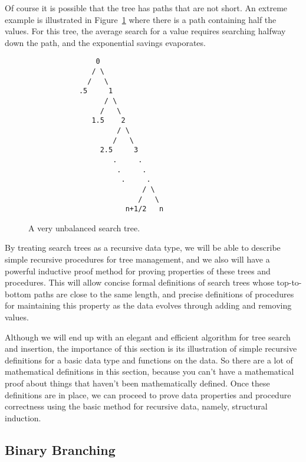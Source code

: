 \begin{definition}
Of course it is possible that the tree has paths that are not short.
An extreme example is illustrated in Figure~\ref{unbalanced} where
there is a path containing half the values.  For this tree, the
average search for a value requires searching halfway down the path,
and the exponential savings evaporates.

\begin{figure}

\begin{center}
\begin{verbatim}
                0
               / \
              /   \
            .5     1
                  / \
                 /   \
               1.5    2
                     / \
                    /   \
                 2.5     3  
                    .     .
                     .     .
                      .     .
                           / \
                          /   \
                       n+1/2   n  
\end{verbatim}   
\end{center}

\caption{A very unbalanced search tree.}

\label{unbalanced}

\end{figure}

By treating search trees as a recursive data type, we will be able to
describe simple recursive procedures for tree management, and we also
will have a powerful inductive proof method for proving properties of
these trees and procedures.  This will allow concise formal
definitions of search trees whose top-to-bottom paths are close to the
same length, and precise definitions of procedures for maintaining this
property as the data evolves through adding and removing values.

Although we will end up with an elegant and efficient algorithm for
tree search and insertion, the importance of this section is its
illustration of simple recursive definitions for a basic data type and
functions on the data.  So there are a lot of mathematical definitions
in this section, because you can't have a mathematical proof about
things that haven't been mathematically defined.  Once these
definitions are in place, we can proceed to prove data properties and
procedure correctness using the basic method for recursive data,
namely, structural induction.

\subsection{Binary Branching}


\end{definition}
